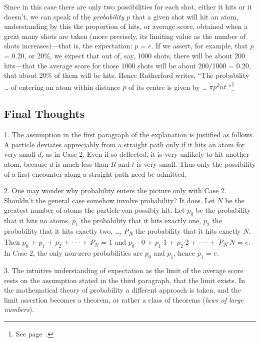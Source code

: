 Since in this case there are only two possibilities for each shot,
either it hits or it doesn't, we can speak of the \emph{probability}
$p$ that a given shot will hit an atom, understanding by this the
proportion of hits, or average score, obtained when a great many shots
are taken (more precisely, its limiting value as the number of shots
increases)---that is, the expectation: $p$ = $e$. If we
assert, for example, that $p$ = 0.20, or 20\%, we expect that out
of, say, 1000 shots, there will be about 200 hits---that the average
score for those 1000 shots will be about 200/1000 = 0.20, that about
20\% of them will be hits. Hence Rutherford writes, ``The probability
\ldots{} of entering an atom within distance $p$ of its centre is
given by \ldots{} $\pi p^{2}nt.$''\footnote{See page~\pageref{eq_s:rutherford}.}

\subsection*{Final Thoughts}

1. The assumption in the first paragraph of the explanation is
justified as follows. A particle deviates appreciably from a straight
path only if it hits an atom for very small $d$, as in Case 2. Even
if so deflected, it is very unlikely to hit another atom, because
$d$ is much less than $R$ and $t$ is very small. Thus
only the possibility of a first encounter along a straight path need be
admitted.

2. One may wonder why probability enters the picture only with Case 2.
Shouldn't the general case somehow involve probability? It does. Let
$N$ be the greatest number of atoms the particle can possibly hit.
Let $p_0$ be the probability that it hits no atoms,
$p_1$ the probability that it hits exactly one,
$p_2$ the probability that it hits exactly two,
\ldots{}, \emph{P\textsubscript{N}} the probability that it hits exactly
$N$. Then $p_0$ + $p_1$ +
$p_2$ + $\cdot \cdot \cdot$ + $P_N$ = 1 and
$p_0$ $\cdot$ 0 + $p_1$$\cdot$1 +
$p_2$$\cdot$2 + $\cdot \cdot \cdot$
+~\emph{P\textsubscript{N}}$\cdot$$N$ = $e$. In Case 2, the only
non-zero probabilities are $p_0$ and
$p_1$, hence $p_1$ = $e$.

3. The intuitive understanding of expectation as the limit of the
average score rests on the assumption stated in the third paragraph,
that the limit exists. In the mathematical theory of probability a
different approach is taken, and the limit assertion becomes a theorem,
or rather a class of theorems (\emph{laws of large numbers}).


